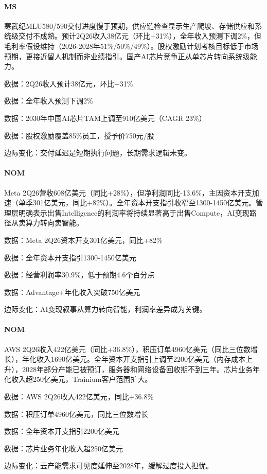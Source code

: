 \documentclass[11pt]{ctexart}
\begin{document}
\paragraph{MS} 寒武纪MLU580/590交付进度慢于预期，供应链检查显示生产爬坡、存储供应和系统级交付不成熟。预计2Q26收入38亿元（环比+31\%），全年收入预测下调2\%，但毛利率假设维持（2026-2028年51\%/50\%/49\%）。股权激励计划考核目标低于市场预期，更接近留人机制而非业绩指引。国产AI芯片竞争正从单芯片转向系统级能力。
{\small\color{refgray}数据：2Q26收入预计38亿元，环比+31\%\par}
{\small\color{refgray}数据：全年收入预测下调2\%\par}
{\small\color{refgray}数据：2030年中国AI芯片TAM上调至910亿美元（CAGR 23\%）\par}
{\small\color{refgray}数据：股权激励覆盖85\%员工，授予价750元/股\par}
{\small\color{refgray}边际变化：交付延迟是短期执行问题，长期需求逻辑未变。\par}
\paragraph{NOM} Meta 2Q26营收608亿美元（同比+28\%），但净利润同比-13.6\%，主因资本开支加速（单季301亿美元，同比+82\%）。全年资本开支指引收窄至1300-1450亿美元。管理层明确表示出售Intelligence的利润率将持续显著高于出售Compute，AI变现路径从卖算力转向卖智能。
{\small\color{refgray}数据：Meta 2Q26资本开支301亿美元，同比+82\%\par}
{\small\color{refgray}数据：全年资本开支指引1300-1450亿美元\par}
{\small\color{refgray}数据：经营利润率30.9\%，低于预期4.6个百分点\par}
{\small\color{refgray}数据：Advantage+年化收入突破750亿美元\par}
{\small\color{refgray}边际变化：AI变现叙事从算力转向智能，利润率差异成为关键。\par}
\paragraph{NOM} AWS 2Q26收入422亿美元（同比+36.8\%），积压订单4960亿美元（同比三位数增长），年化收入1690亿美元。全年资本开支指引上调至2200亿美元（内存成本上升），2028年部分产能已被预订，服务器和网络设备回收期不到三年。芯片业务年化收入超250亿美元，Trainium客户范围扩大。
{\small\color{refgray}数据：AWS 2Q26收入422亿美元，同比+36.8\%\par}
{\small\color{refgray}数据：积压订单4960亿美元，同比三位数增长\par}
{\small\color{refgray}数据：全年资本开支指引2200亿美元\par}
{\small\color{refgray}数据：芯片业务年化收入超250亿美元\par}
{\small\color{refgray}边际变化：云产能需求可见度延伸至2028年，缓解过度投入担忧。\par}
\end{document}
